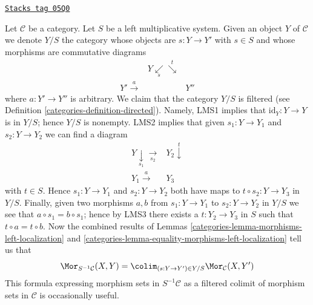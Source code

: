 \begin{remark}
\label{categories-remark-left-localization-morphisms-colimit}
\href{https://stacks.math.columbia.edu/tag/05Q0}{\texttt{Stacks tag 05Q0}}

Let $\mathcal{C}$ be a category. Let $S$ be a left multiplicative system.
Given an object $Y$ of $\mathcal{C}$ we denote $Y/S$ the category whose
objects are $s : Y \to Y'$ with $s \in S$ and whose morphisms are
commutative diagrams
$$
\begin{array}{ccc} & Y \underset{s}{\swarrow}\overset{t}{\searrow} &  \\ Y' \overset{a}{\longrightarrow} &  & Y''\end{array}
$$
where $a : Y' \to Y''$ is arbitrary. We claim that the category
$Y/S$ is filtered (see
Definition \ref{categories-definition-directed}).
Namely, LMS1 implies that $\text{id}_Y : Y \to Y$
is in $Y/S$; hence $Y/S$ is nonempty. LMS2 implies that given
$s_1 : Y \to Y_1$ and $s_2 : Y \to Y_2$ we can find a diagram
$$
\begin{array}{cc}Y \underset{s_1}{\downarrow}\underset{s_2}{\longrightarrow} & Y_2 \overset{t}{\downarrow} \\ Y_1 \overset{a}{\longrightarrow} & Y_3\end{array}
$$
with $t \in S$. Hence $s_1 : Y \to Y_1$ and $s_2 : Y \to Y_2$
both have maps to $t \circ s_2 : Y \to Y_3$ in $Y/S$. Finally, given
two morphisms $a, b$ from $s_1 : Y \to Y_1$ to $s_2 : Y \to Y_2$
in $Y/S$ we see that $a \circ s_1 = b \circ s_1$; hence by LMS3
there exists a $t : Y_2 \to Y_3$ in $S$ such that
$t \circ a = t \circ b$.
Now the combined results of
Lemmas \ref{categories-lemma-morphisms-left-localization} and
\ref{categories-lemma-equality-morphisms-left-localization}
tell us that
\begin{equation}
\label{equation-left-localization-morphisms-colimit}
\Mor_{S^{-1}\mathcal{C}}(X, Y) =
\colim_{(s : Y \to Y') \in Y/S} \Mor_\mathcal{C}(X, Y')
\end{equation}
This formula expressing morphism sets in $S^{-1}\mathcal{C}$ as a filtered
colimit of morphism sets in $\mathcal{C}$ is occasionally useful.
\end{remark}

